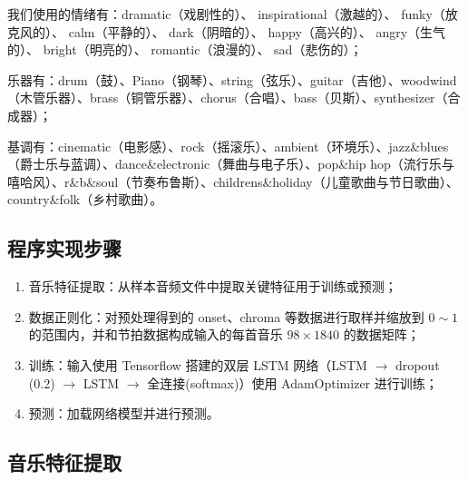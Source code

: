 \documentclass[a4paper,utf8,10pt]{article}
\newcommand{\sept}{\setlength\itemsep{-4pt}}
\begin{document}
我们使用的情绪有：dramatic（戏剧性的）、 inspirational（激越的）、 funky（放克风的）、 calm（平静的）、 dark（阴暗的）、 happy（高兴的）、 angry（生气的）、 bright（明亮的）、 romantic（浪漫的）、 sad（悲伤的）；

乐器有：drum（鼓）、Piano（钢琴）、string（弦乐）、guitar（吉他）、woodwind（木管乐器）、brass（铜管乐器）、chorus（合唱）、bass（贝斯）、synthesizer（合成器）；

基调有：cinematic（电影感）、rock（摇滚乐）、ambient（环境乐）、jazz\&blues（爵士乐与蓝调）、dance\&electronic（舞曲与电子乐）、pop\&hip hop（流行乐与嘻哈风）、r\&b\&soul（节奏布鲁斯）、childrens\&holiday（儿童歌曲与节日歌曲）、country\&folk（乡村歌曲）。

\subsection{程序实现步骤}

\begin{enumerate}
  \sept
  \item 音乐特征提取：从样本音频文件中提取关键特征用于训练或预测；
  \item 数据正则化：对预处理得到的 onset、chroma 等数据进行取样并缩放到 $0 \sim 1$ 的范围内，并和节拍数据构成输入的每首音乐 $98 \times 1840$ 的数据矩阵；
  \item 训练：输入使用 Tensorflow 搭建的双层 LSTM 网络（LSTM $\rightarrow$ dropout (0.2) $\rightarrow$ LSTM $\rightarrow$ 全连接(softmax)）使用 AdamOptimizer 进行训练；
  \item 预测：加载网络模型并进行预测。
\end{enumerate}

\subsection{音乐特征提取}
\end{document}
